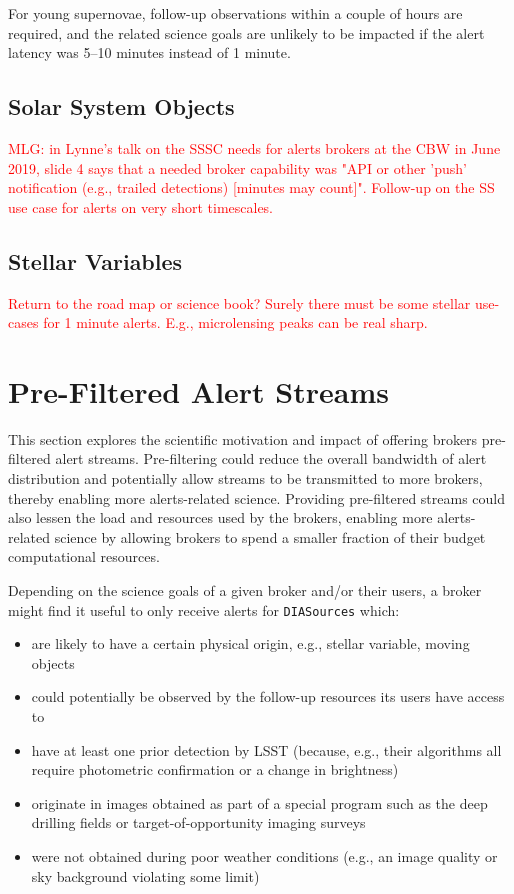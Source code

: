 \documentclass[DM,lsstdraft,authoryear,toc]{lsstdoc}
\begin{document}
For young supernovae, follow-up observations within a couple of hours are required, and the related science goals are unlikely to be impacted if the alert latency was 5--10 minutes instead of 1 minute.

\subsection{Solar System Objects}\label{ssec:latency_sso}

\textcolor{red}{MLG: in Lynne's talk on the SSSC needs for alerts brokers at the CBW in June 2019, slide 4 says that a needed broker capability was "API or other 'push' notification (e.g., trailed detections) [minutes may count]". Follow-up on the SS use case for alerts on very short timescales.}

\subsection{Stellar Variables}\label{ssec:latency_stars}

\textcolor{red}{Return to the road map or science book? Surely there must be some stellar use-cases for 1 minute alerts. E.g., microlensing peaks can be real sharp.}

\clearpage
\section{Pre-Filtered Alert Streams} \label{sec:prefilter}

This section explores the scientific motivation and impact of offering brokers pre-filtered alert streams. 
Pre-filtering could reduce the overall bandwidth of alert distribution and potentially allow streams to be transmitted to more brokers, thereby enabling more alerts-related science.
Providing pre-filtered streams could also lessen the load and resources used by the brokers, enabling more alerts-related science by allowing brokers to spend a smaller fraction of their budget computational resources.

Depending on the science goals of a given broker and/or their users, a broker might find it useful to only receive alerts for {\tt DIASources} which:
\begin{itemize}
\item are likely to have a certain physical origin, e.g., stellar variable, moving objects
\item could potentially be observed by the follow-up resources its users have access to
\item have at least one prior detection by LSST (because, e.g., their algorithms all require photometric confirmation or a change in brightness)
\item originate in images obtained as part of a special program such as the deep drilling fields or target-of-opportunity imaging surveys
\item were not obtained during poor weather conditions (e.g., an image quality or sky background violating some limit)
\end{itemize}
\end{document}

